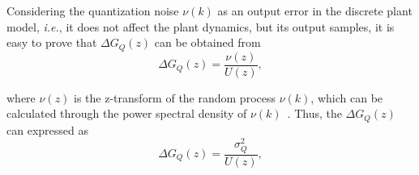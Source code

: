 \documentclass{sig-alternate-05-2015}
\begin{document}
Considering the quantization noise $\nu(k)$ as an output error in the
discrete plant model, {\it i.e.}, it does not affect the plant dynamics, but
its output samples, it is easy to prove that $\Delta{G_{Q}(z)}$ can be
obtained from
%
\begin{equation}
\label{eq:quantization_tf}
\Delta{G_{Q}(z)}=\frac{\nu(z)}{U(z)},
\end{equation}

\noindent where $\nu(z)$ is the z-transform of the random process $\nu(k)$,
which can be calculated through the power spectral density of
$\nu(k)$~\cite{poularikas2000transforms}.  Thus, the $\Delta{G_{Q}(z)}$ can
expressed as
%
\begin{equation}
\label{eq:deltag_var}
\Delta{G_{Q}(z)}=\frac{\sigma_{Q}^{2}}{U(z)},
\end{equation}
\end{document}
